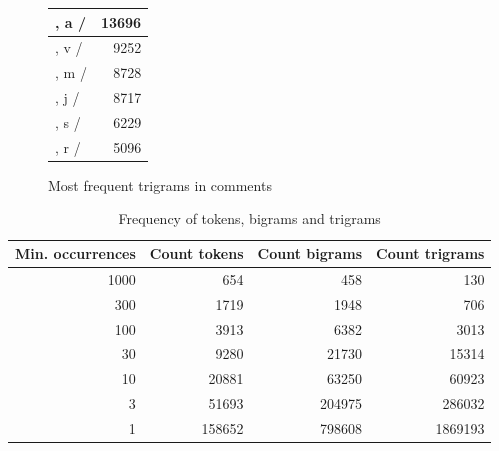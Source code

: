 \documentclass[article,type=msc,colorback,accentcolor=tud7b]{tudthesis}
\begin{document}
\begin{figure}[H]
\begin{floatrow}
{{\begin{tabular}{| l | r |}
		, a / & 13696 \\ \hline
		, v / & 9252 \\ \hline
		, m / & 8728 \\ \hline
		, j / & 8717 \\ \hline
		, s / & 6229 \\ \hline
		, r / & 5096 \\ \hline
      \end{tabular}
      }
      \quad
      }{%
        \caption{Most frequent trigrams in comments}
        \label{tab:frequent_trigrams}
      }
      \end{floatrow}
	\end{figure}

	\begin{table}[H]
	  \begin{tabular}{ | r | r | r | r | }
		\hline
		Min. occurrences & Count tokens & Count bigrams & Count trigrams \\ \hline
		1000 & 654 & 458 & 130 \\ \hline
		300 & 1719 & 1948 & 706 \\ \hline
		100 & 3913 & 6382 & 3013 \\ \hline
		30 & 9280 & 21730 & 15314 \\ \hline
		10 & 20881 & 63250 & 60923 \\ \hline
		3 & 51693 & 204975 & 286032 \\ \hline
		1 & 158652 & 798608 & 1869193 \\ \hline
	  \end{tabular}
      \caption{Frequency of tokens, bigrams and trigrams}
      \label{tab:frequency_tokens_bigrams_trigrams}
	\end{table}
  
\end{document}
